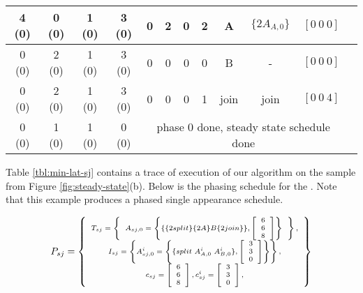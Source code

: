 \begin{table*}[t]
\begin{tabular}{|c|c|c|c|c|c|c|c|c|c|c|c|}
\hline 4 (0) & 0 (0) & 1 (0) & 3 (0) & 0 & 2 & 0 & 2 & A & $\{2A_{A,0}\}$ & $[0\ 0\ 0]$ \\
\hline 0 (0) & 2 (0) & 1 (0) & 3 (0) & 0 & 0 & 0 & 0 & B & - & $[0\ 0\ 0]$ \\
\hline 0 (0) & 2 (0) & 1 (0) & 3 (0) & 0 & 0 & 0 & 1 & join & join  & $[0\ 0\ 4]$ \\
\hline 0 (0) &  1 (0) &  1 (0) &  0 (0) & \multicolumn{7}{|c|}{phase 0 done, steady state schedule done} \\
\hline
\end{tabular}
\caption[Execution of Minimal Latency Scheduling Algorithm on a
{\splitjoin}]{Execution of Minimal Latency Scheduling Algorithm on
{\splitjoin} from Figure \ref{fig:steady-state}(b). In the ``data
in {\Channel}'' columns, the first value represents the actual
number of data in the {\Channel}, which can be negative due to
data borrowing. The second value is the minimal number of data
items borrowed from the {\Channel}.}
\label{tbl:min-lat-sj}
\end{table*}

Table \ref{tbl:min-lat-sj} contains a trace of execution of our
algorithm on the sample {\splitjoin} from Figure
\ref{fig:steady-state}(b). Below is the phasing schedule for the
{\splitjoin}. Note that this example produces a phased single
appearance schedule.

\begin{displaymath} \scriptsize
P_{sj} = \left\{
\begin{array}{c}
T_{sj} = \left\{
\begin{array}{c}
A_{sj,0} = \left\{ \{\{2 split\}\{2A\}B\{2 join\}\}, \left[\begin{array}{c} 6 \\ 6 \\ 8 \end{array}\right]\right\} \\
\end{array}\right\}, \\
I_{sj} = \left\{ A^i_{sj,0} = \left\{
\{split\ A^i_{A,0}\ A^i_{B,0}\}, \left[\begin{array}{c} 3 \\ 3 \\ 0 \\
\end{array}\right]\right\}
\right\}, \\
c_{sj} = \left[ \begin{array}{c} 6 \\ 6 \\ 8 \end{array} \right],
c^i_{sj} = \left[ \begin{array}{c} 3 \\ 3 \\ 0 \end{array}
\right],
\end{array}
\right\}
\end{displaymath}
